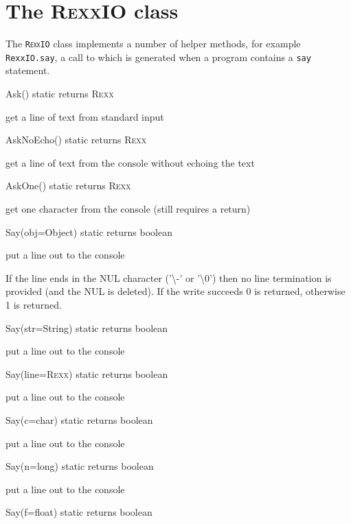 \section{The R\textsc{exx}IO class}\label{refrexxio}
 
The \texttt{R\textsc{exx}IO} class implements a number of helper methods, for example \texttt{RexxIO.say}, a call to which is generated when a program contains a \texttt{say} statement. 

\begin{description}
  \item{Ask() static returns R\textsc{exx}}

get a line of text from standard input

  \item{AskNoEcho() static returns R\textsc{exx}}

  get a line of text from the console without echoing the text

  \item{AskOne() static returns R\textsc{exx}}

get one character from the console (still requires a return)
 \item{Say(obj=Object) static returns boolean}

put a line out to the console

If the line ends in the NUL character ('\textbackslash -' or
    '\textbackslash 0') then no
    line termination is provided (and the NUL is deleted).
    If the write succeeds 0 is returned, otherwise 1 is returned.
 
  \item{Say(str=String) static returns boolean}

put a line out to the console
  \item{Say(line=R\textsc{exx}) static returns boolean}

put a line out to the console
  \item{Say(c=char) static returns boolean}

put a line out to the console
  \item{Say(n=long) static returns boolean}

put a line out to the console
  \item{Say(f=float)   static returns boolean}


\end{description}

